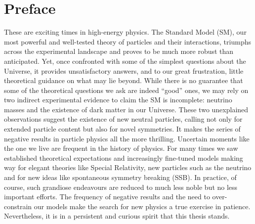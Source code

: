\documentclass[openany,twoside,frontopenright,openright]{ip3thesis}
\begin{document}
\chapter*{Preface}

These are exciting times in high-energy physics. The Standard Model (SM), our most powerful and well-tested theory of particles and their interactions, triumphs across the experimental landscape and proves to be much more robust than anticipated. Yet, once confronted with some of the simplest questions about the Universe, it provides unsatisfactory answers, and to our great frustration, little theoretical guidance on what may lie beyond. While there is no guarantee that some of the theoretical questions we ask are indeed ``good'' ones, we may rely on two indirect experimental evidence to claim the SM is incomplete: neutrino masses and the existence of dark matter in our Universe. These two unexplained observations suggest the existence of new neutral particles, calling not only for extended particle content but also for novel symmetries. It makes the series of negative results in particle physics all the more thrilling. Uncertain moments like the one we live are frequent in the history of physics. For many times we saw established theoretical expectations and increasingly fine-tuned models making way for elegant theories like Special Relativity, new particles such as the neutrino and for new ideas like spontaneous symmetry breaking (SSB). In practice, of course, such grandiose endeavours are reduced to much less noble but no less important efforts. The frequency of negative results and the need to over-constrain our models make the search for new physics a true exercise in patience. Nevertheless, it is in a persistent and curious spirit that this thesis stands.
\end{document}
